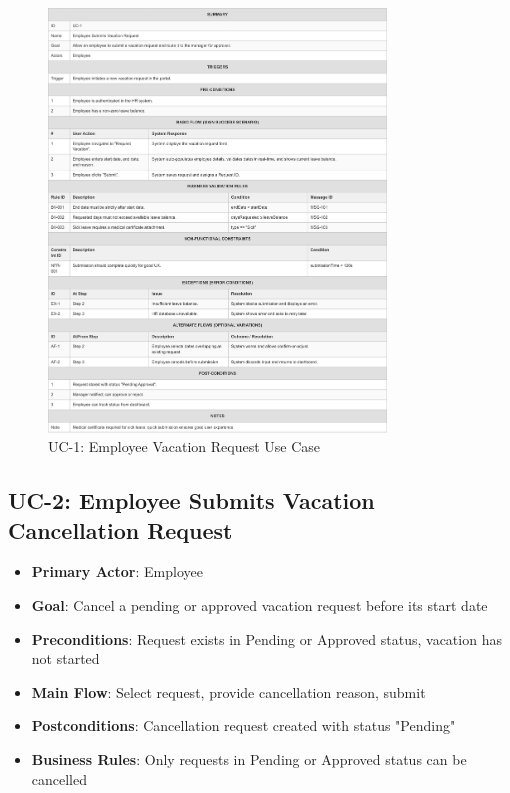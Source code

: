 \documentclass[12pt,a4paper]{article}
\begin{document}
\begin{figure}[H]
\centering
\includegraphics[width=0.8\textwidth]{Use-Cases/UC-1-Employee-Vacation-Request/UC-1-Employee-Vacation-Request-1.png}
\caption{UC-1: Employee Vacation Request Use Case}
\label{fig:uc1}
\end{figure}

\subsection{UC-2: Employee Submits Vacation Cancellation Request}
\begin{itemize}
    \item \textbf{Primary Actor}: Employee
    \item \textbf{Goal}: Cancel a pending or approved vacation request before its start date
    \item \textbf{Preconditions}: Request exists in Pending or Approved status, vacation has not started
    \item \textbf{Main Flow}: Select request, provide cancellation reason, submit
    \item \textbf{Postconditions}: Cancellation request created with status "Pending"
    \item \textbf{Business Rules}: Only requests in Pending or Approved status can be cancelled
\end{itemize}
\end{document}
